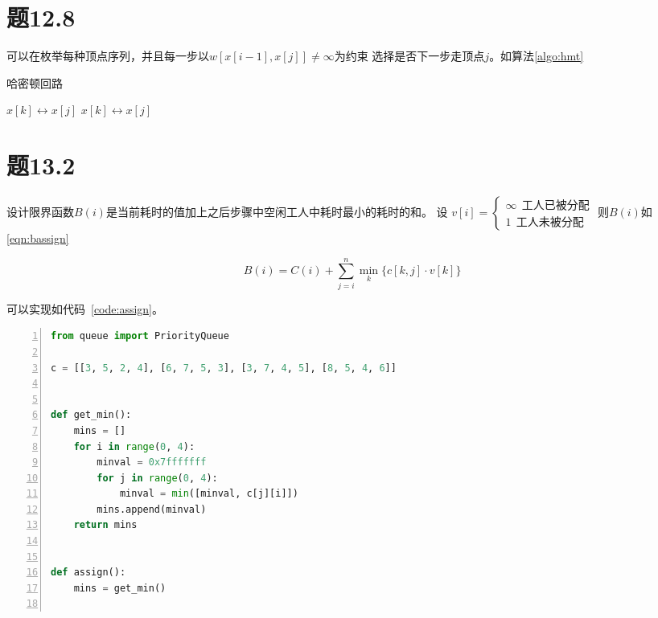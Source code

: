\documentclass[a4paper,twoside]{article}
\begin{document}
\begin{spacing}{1.2}
\section{题12.8}

可以在枚举每种顶点序列，并且每一步以$w[x[i-1],x[j]]\ne \infty$为约束
选择是否下一步走顶点$j$。如算法\ref{algo:hmt}


\begin{algorithm}[htbp]
	\caption{哈密顿回路}
	\label{algo:hmt}
	\begin{algorithmic}[1]
					\State {}
				\EndIf
			\EndIf
					\State $x[k]\leftrightarrow x[j]$
					\State {}
					\State $x[k]\leftrightarrow x[j]$
				\EndIf
			\EndFor
		\EndProcedure
	\end{algorithmic}
\end{algorithm}	

\section{题13.2}

设计限界函数$B(i)$是当前耗时的值加上之后步骤中空闲工人中耗时最小的耗时的和。
设
$v[i]=\begin{cases}
	\infty \ \ \mbox{工人已被分配} \\
	1 \ \ \mbox{工人未被分配}
\end{cases}$
则$B(i)$如\eqref{eqn:bassign}


\begin{equation}
	\label{eqn:bassign}
	B(i)=C(i)+\sum_{j=i}^{n}\mathop{min}_k{\{c[k,j]\cdot v[k]\}}
\end{equation}

可以实现如代码~\ref{code:assign}。

\begin{lstlisting}[language=Python,numbers=left,style=PythonStyle,caption=工人分配问题,label={code:assign}]
from queue import PriorityQueue

c = [[3, 5, 2, 4], [6, 7, 5, 3], [3, 7, 4, 5], [8, 5, 4, 6]]


def get_min():
    mins = []
    for i in range(0, 4):
        minval = 0x7fffffff
        for j in range(0, 4):
            minval = min([minval, c[j][i]])
        mins.append(minval)
    return mins


def assign():
    mins = get_min()


\end{lstlisting}
\end{spacing}
\end{document}
